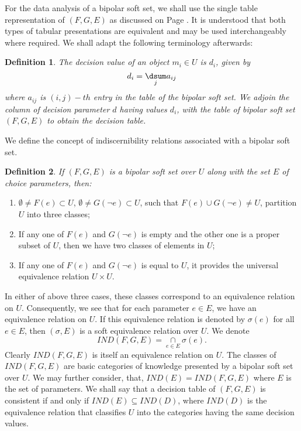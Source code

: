 \documentclass{amsart}
\theoremstyle{plain}
\newtheorem{definition}{Definition}
\numberwithin{equation}{section}
\begin{document}
For the data analysis of a bipolar soft set, we shall use the single table
representation of $(F,G,E)$ as discussed on Page \pageref{tbldesc1}. It is
understood that both types of tabular presentations are equivalent and may
be used interchangeably where required. We shall adapt the following
terminology afterwards:

\begin{definition}
The \textit{decision value} of an object $m_{i}\in U$ is $d_{i}$, given by\begin{equation*}
d_{i}=\underset{j}{\dsum }a_{ij}
\end{equation*}where $a_{ij}$ is $(i,j)-th$ entry in the table of the bipolar soft set. We
adjoin the column of decision parameter $d$ having values $d_{i}$, with the
table of bipolar soft set $(F,G,E)$ to obtain the \textit{decision table}.
\end{definition}

We define the concept of indiscernibility relations associated with a
bipolar soft set.

\begin{definition}
If $(F,G,E)$ is a bipolar soft set over $U$ along with the set $E$ of choice
parameters, then:
\end{definition}

\begin{enumerate}
\item $\emptyset \neq F(e)\subset U$, $\emptyset \neq G(\lnot e)\subset U$,
such that $F(e)\cup G(\lnot e)\neq U$, partition $U$ into three classes;

\item If any one of $F(e)$ and $G(\lnot e)$ is empty and the other one is a
proper subset of $U$, then we have two classes of elements in $U$;

\item If any one of $F(e)$ and $G(\lnot e)$ is equal to $U$, it provides the
universal equivalence relation $U\times U$.
\end{enumerate}

In either of above three cases, these classes correspond to an equivalence
relation on $U$. Consequently, we see that for each parameter $e\in E$, we
have an equivalence relation on $U$. If this equivalence relation is denoted
by $\sigma (e)$ for all $e\in E$, then $(\sigma ,E)$ is a soft equivalence
relation over $U$. We denote 
\begin{equation*}
IND(F,G,E)=\underset{e\in E}{\cap }\sigma (e)\text{.}
\end{equation*}Clearly $IND(F,G,E)$ is itself an equivalence relation on $U$. The classes
of $IND(F,G,E)$ are basic categories of knowledge presented by a bipolar
soft set over $U$. We may further consider, that, $IND(E)=IND(F,G,E)$ where $E$ is the set of parameters. We shall say that a decision table of $(F,G,E)$
is consistent if and only if $IND(E)\subseteq IND(D)$, where $IND(D)$ is the
equivalence relation that classifies $U$ into the categories having the same
decision values.
\end{document}
